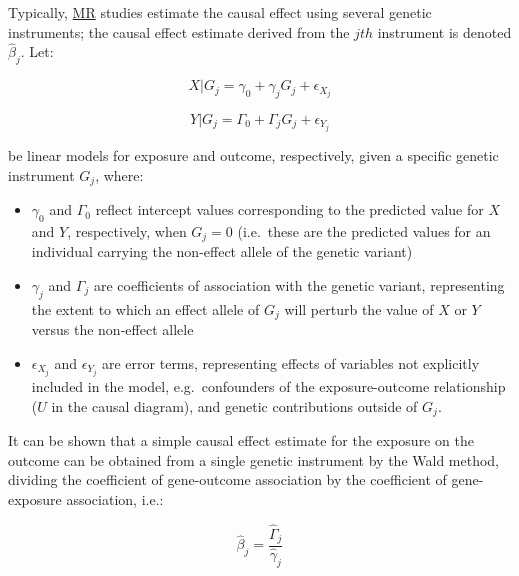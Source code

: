 \documentclass[
]{article}
\begin{document}
Typically, \hyperref[acronyms_MR]{MR} studies estimate the causal effect using several genetic instruments; the causal effect estimate derived from the \(jth\) instrument is denoted \(\hat{\beta}_j\). Let:

\begin{equation} 
X|G_j = \gamma_0 + \gamma_j G_j + \epsilon_{X_j}
\end{equation}

\begin{equation} 
Y|G_j = \Gamma_0 + \Gamma_j G_j + \epsilon_{Y_j}
\end{equation}

be linear models for exposure and outcome, respectively, given a specific genetic instrument \(G_j\), where:

\begin{itemize}
\item
  \(\gamma_0\) and \(\Gamma_0\) reflect intercept values corresponding to the predicted value for \(X\) and \(Y\), respectively, when \(G_j = 0\) (i.e.~these are the predicted values for an individual carrying the non-effect allele of the genetic variant)
\item
  \(\gamma_j\) and \(\Gamma_j\) are coefficients of association with the genetic variant, representing the extent to which an effect allele of \(G_j\) will perturb the value of \(X\) or \(Y\) versus the non-effect allele
\item
  \(\epsilon_{X_j}\) and \(\epsilon_{Y_j}\) are error terms, representing effects of variables not explicitly included in the model, e.g.~confounders of the exposure-outcome relationship (\(U\) in the causal diagram), and genetic contributions outside of \(G_j\).
\end{itemize}

It can be shown that a simple causal effect estimate for the exposure on the outcome can be obtained from a single genetic instrument by the Wald method, dividing the coefficient of gene-outcome association by the coefficient of gene-exposure association, i.e.:

\begin{equation} 
\hat{\beta}_j = \frac {\hat{\Gamma}_j} {\hat{\gamma}_j}
\end{equation}
\end{document}
